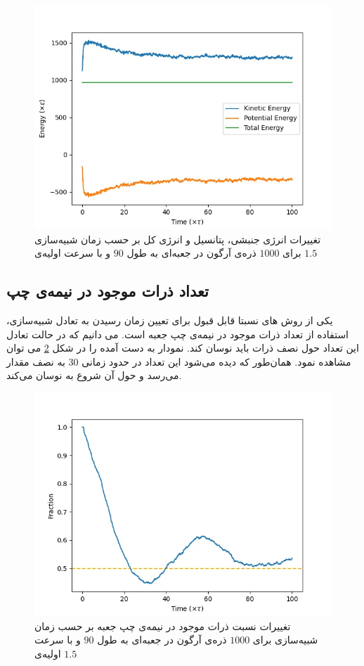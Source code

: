 \documentclass[11pt, a4paper]{article}
\begin{document}
\begin{figure}[h!]
	\centering
  \includegraphics[width=.7\textwidth]{MD_90_1000_2_0.001_energies.jpg}
  \caption{تغییرات انرژی جنبشی، پتانسیل و انرژی کل بر حسب زمان شبیه‌سازی برای $1000$ ذره‌ی آرگون در جعبه‌ای به طول $90$ و با سرعت اولیه‌ی $1.5$}
  \label{fig:1000_energies}
\end{figure}

\subsection{تعداد ذرات موجود در نیمه‌ی چپ}
یکی از روش ‌های نسبتا قابل قبول برای تعیین زمان رسیدن به تعادل شبیه‌سازی،
استفاده از تعداد ذرات موجود در نیمه‌ی چپ جعبه است.
می دانیم که در حالت تعادل این تعداد حول نصف ذرات باید نوسان کند.
نمودار به دست آمده را در شکل
\ref{fig:1000_left_side}
می توان مشاهده نمود.
همان‌طور که دیده می‌شود این تعداد در حدود زمانی
$30$
به نصف مقدار می‌رسد و حول آن شروع به نوسان می‌کند.

\begin{figure}[h!]
	\centering
  \includegraphics[width=.7\textwidth]{MD_90_1000_2_0.001_left_side_numbers.jpg}
  \caption{تغییرات نسبت ذرات موجود در نیمه‌ی چپ جعبه بر حسب زمان شبیه‌سازی برای $1000$ ذره‌ی آرگون در جعبه‌ای به طول $90$ و با سرعت اولیه‌ی $1.5$}
  \label{fig:1000_left_side}
\end{figure}
\end{document}
